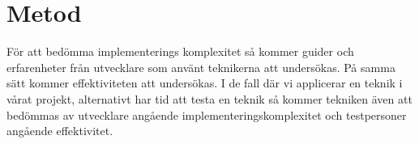 \section{Metod}
\label{sec:bjorn-method}

För att bedömma implementerings komplexitet så kommer guider och erfarenheter från utvecklare som använt teknikerna att undersökas. På samma sätt kommer effektiviteten att undersökas. I de fall där vi applicerar en teknik i vårat projekt, alternativt har tid att testa en teknik så kommer tekniken även att bedömmas av utvecklare angående implementeringskomplexitet och testpersoner angående effektivitet.